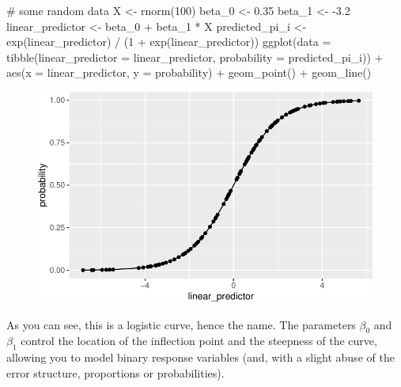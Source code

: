\documentclass[
  letterpaper,
  DIV=11,
  numbers=noendperiod]{scrreprt}
\newenvironment{Shaded}{\begin{snugshade}}{\end{snugshade}}
\newcommand{\AttributeTok}[1]{\textcolor[rgb]{0.40,0.45,0.13}{#1}}
\newcommand{\CommentTok}[1]{\textcolor[rgb]{0.37,0.37,0.37}{#1}}
\newcommand{\DecValTok}[1]{\textcolor[rgb]{0.68,0.00,0.00}{#1}}
\newcommand{\FloatTok}[1]{\textcolor[rgb]{0.68,0.00,0.00}{#1}}
\newcommand{\FunctionTok}[1]{\textcolor[rgb]{0.28,0.35,0.67}{#1}}
\newcommand{\NormalTok}[1]{\textcolor[rgb]{0.00,0.23,0.31}{#1}}
\newcommand{\OtherTok}[1]{\textcolor[rgb]{0.00,0.23,0.31}{#1}}
\newcommand{\SpecialCharTok}[1]{\textcolor[rgb]{0.37,0.37,0.37}{#1}}
\begin{document}
\begin{Shaded}
\begin{Highlighting}[]
\CommentTok{\# some random data}
\NormalTok{X }\OtherTok{\textless{}{-}} \FunctionTok{rnorm}\NormalTok{(}\DecValTok{100}\NormalTok{)}
\NormalTok{beta\_0 }\OtherTok{\textless{}{-}} \FloatTok{0.35}
\NormalTok{beta\_1 }\OtherTok{\textless{}{-}} \SpecialCharTok{{-}}\FloatTok{3.2}
\NormalTok{linear\_predictor }\OtherTok{\textless{}{-}}\NormalTok{ beta\_0 }\SpecialCharTok{+}\NormalTok{ beta\_1 }\SpecialCharTok{*}\NormalTok{ X}
\NormalTok{predicted\_pi\_i }\OtherTok{\textless{}{-}} \FunctionTok{exp}\NormalTok{(linear\_predictor) }\SpecialCharTok{/}\NormalTok{ (}\DecValTok{1} \SpecialCharTok{+} \FunctionTok{exp}\NormalTok{(linear\_predictor))}
\FunctionTok{ggplot}\NormalTok{(}\AttributeTok{data =} \FunctionTok{tibble}\NormalTok{(}\AttributeTok{linear\_predictor =}\NormalTok{ linear\_predictor, }\AttributeTok{probability =}\NormalTok{ predicted\_pi\_i)) }\SpecialCharTok{+} 
  \FunctionTok{aes}\NormalTok{(}\AttributeTok{x =}\NormalTok{ linear\_predictor, }\AttributeTok{y =}\NormalTok{ probability) }\SpecialCharTok{+} 
  \FunctionTok{geom\_point}\NormalTok{() }\SpecialCharTok{+} \FunctionTok{geom\_line}\NormalTok{()}
\end{Highlighting}
\end{Shaded}

\begin{figure}[H]

{\centering \includegraphics{./13-generalized_linear_models_files/figure-pdf/unnamed-chunk-2-1.pdf}

}

\end{figure}

As you can see, this is a logistic curve, hence the name. The parameters
\(\beta_0\) and \(\beta_1\) control the location of the inflection point
and the steepness of the curve, allowing you to model binary response
variables (and, with a slight abuse of the error structure, proportions
or probabilities).
\end{document}
